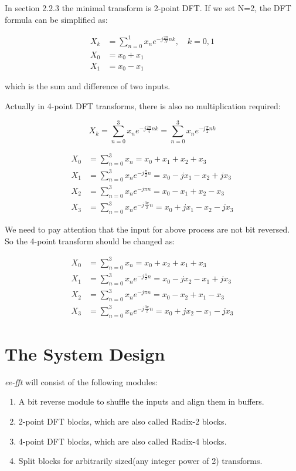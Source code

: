 \documentclass[a4paper]{report}
\begin{document}
	In section 2.2.3 the minimal transform is 2-point DFT. If we set N=2, the DFT formula can be simplified as:

\begin{align*}
	X_k &= \sum^{1}_{n=0} x_n e^{-j\frac{2\pi}{N}nk}, \quad k = 0, 1 \\
	X_0 &= x_0 + x_1 \\
	X_1 &= x_0 - x_1
\end{align*}

	which is the sum and difference of two inputs.
	
	\bigskip
	
	Actually in 4-point DFT transforms, there is also no multiplication required:

\[X_k = \sum_{n=0}^{3} x_n e^{-j\frac{2\pi}{4}nk} = \sum_{n=0}^{3} x_n e^{-j\frac{\pi}{2}nk} \]

\begin{align*}
X_0 &= \sum_{n=0}^{3} x_n = x_0 + x_1 + x_2 + x_3 \\
X_1 &= \sum_{n=0}^{3} x_n e^{-j\frac{\pi}{2}n} = x_0 - jx_1 - x_2 + jx_3 \\
X_2 &= \sum_{n=0}^{3} x_n e^{-j\pi n} = x_0 - x_1 + x_2 - x_3 \\
X_3 &= \sum_{n=0}^{3} x_n e^{-j\frac{3\pi}{2} n} = x_0 + jx_1 - x_2 - jx_3
\end{align*}

	We need to pay attention that the input for above process are not bit reversed. So the 4-point transform should be changed as:
	
\begin{align*}
X_0 &= \sum_{n=0}^{3} x_n = x_0 + x_2 + x_1 + x_3 \\
X_1 &= \sum_{n=0}^{3} x_n e^{-j\frac{\pi}{2}n} = x_0 - jx_2 - x_1 + jx_3 \\
X_2 &= \sum_{n=0}^{3} x_n e^{-j\pi n} = x_0 - x_2 + x_1 - x_3 \\
X_3 &= \sum_{n=0}^{3} x_n e^{-j\frac{3\pi}{2} n} = x_0 + jx_2 - x_1 - jx_3
\end{align*}

\section{The System Design} \indent

	\textit{ee-fft} will consist of the following modules:
	
	\begin{enumerate}
		\item A bit reverse module to shuffle the inputs and align them in buffers.
		\item 2-point DFT blocks, which are also called Radix-2 blocks.
		\item 4-point DFT blocks, which are also called Radix-4 blocks.
		\item Split blocks for arbitrarily sized(any integer power of 2) transforms.
	\end{enumerate}
	
\end{document}
